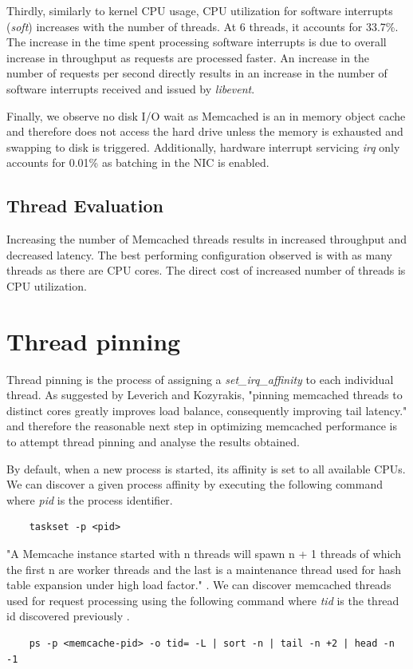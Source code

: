 Thirdly, similarly to kernel CPU usage, CPU utilization for software interrupts (\textit{soft}) increases with the number of threads. At 6 threads, it accounts for 33.7\%. The increase in the time spent processing software interrupts is due to overall increase in throughput as requests are processed faster. An increase in the number of requests per second directly results in an increase in the number of software interrupts received and issued by \textit{libevent}.

Finally, we observe no disk I/O wait as Memcached is an in memory object cache and therefore does not access the hard drive unless the memory is exhausted and swapping to disk is triggered. Additionally, hardware interrupt servicing \textit{irq} only accounts for 0.01\% as batching in the NIC is enabled.


\subsection{Thread Evaluation}
Increasing the number of Memcached threads results in increased throughput and decreased latency. The best performing configuration observed is with as many threads as there are CPU cores. The direct cost of increased number of threads is CPU utilization.


\section{Thread pinning}
\label{sec:thread-pinning}
Thread pinning is the process of assigning a \textit{set\_irq\_affinity} to each individual thread. As suggested by Leverich and Kozyrakis, "pinning memcached threads to distinct cores greatly improves load balance, consequently improving tail latency." \cite{leverich2014reconciling} and therefore the reasonable next step in optimizing memcached performance is to attempt thread pinning and analyse the results obtained.

By default, when a new process is started, its affinity is set to all available CPUs. We can discover a given process affinity by executing the following command where \textit{pid} is the process identifier.

\begin{lstlisting}
    taskset -p <pid>
\end{lstlisting}


"A Memcache instance started with n threads will spawn n + 1 threads of which the first n are worker threads and the last is a maintenance thread used for hash table expansion under high load factor." \cite{solarflarememcached}. We can discover memcached threads used for request processing using the following command where \textit{tid} is the thread id discovered previously \cite{solarflarememcached}.
\begin{lstlisting}
    ps -p <memcache-pid> -o tid= -L | sort -n | tail -n +2 | head -n -1
\end{lstlisting}

